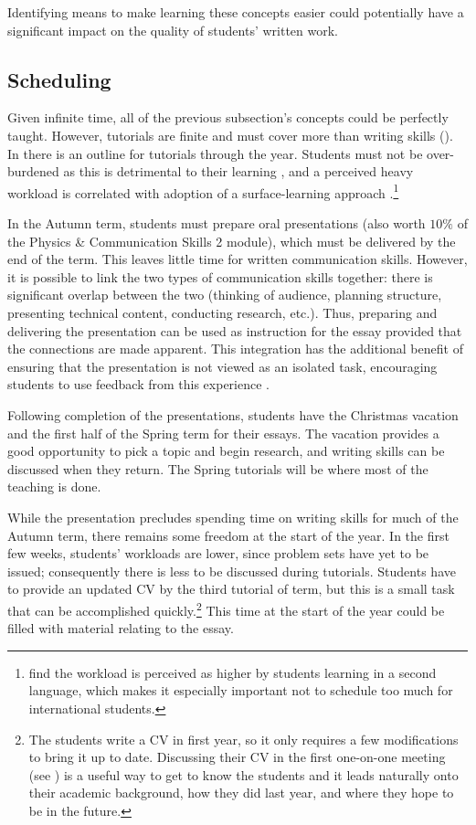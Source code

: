 Identifying means to make learning these concepts easier could potentially have a significant impact on the quality of students' written work.

\subsection{Scheduling}\label{sec:timetable}

Given infinite time, all of the previous subsection's concepts could be perfectly taught. However, tutorials are finite and must cover more than writing skills (). In  there is an outline for tutorials through the year. Students must not be over-burdened as this is detrimental to their learning \citep[chapter 8]{Ramsden1992}, and a perceived heavy workload is correlated with adoption of a surface-learning approach \citep[and references therein]{Kember1998}.\footnote{\citet{Kember1998} find the workload is perceived as higher by students learning in a second language, which makes it especially important not to schedule too much for international students.}

In the Autumn term, students must prepare oral presentations (also worth $10\%$ of the Physics \& Communication Skills 2 module), which must be delivered by the end of the term. This leaves little time for written communication skills. However, it is possible to link the two types of communication skills together: there is significant overlap between the two (thinking of audience, planning structure, presenting technical content, conducting research, etc.). Thus, preparing and delivering the presentation can be used as instruction for the essay provided that the connections are made apparent. This integration has the additional benefit of ensuring that the presentation is not viewed as an isolated task, encouraging students to use feedback from this experience \citep{Housell2003}.

Following completion of the presentations, students have the Christmas vacation and the first half of the Spring term for their essays. The vacation provides a good opportunity to pick a topic and begin research, and writing skills can be discussed when they return. The Spring tutorials will be where most of the teaching is done.

While the presentation precludes spending time on writing skills for much of the Autumn term, there remains some freedom at the start of the year. In the first few weeks, students' workloads are lower, since problem sets have yet to be issued; consequently there is less to be discussed during tutorials. Students have to provide an updated CV by the third tutorial of term, but this is a small task that can be accomplished quickly.\footnote{The students write a CV in first year, so it only requires a few modifications to bring it up to date. Discussing their CV in the first one-on-one meeting (see ) is a useful way to get to know the students and it leads naturally onto their academic background, how they did last year, and where they hope to be in the future.} This time at the start of the year could be filled with material relating to the essay.

